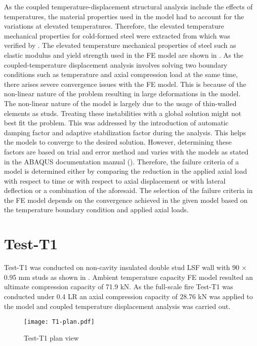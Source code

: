 As the coupled temperature-displacement structural analysis include the effects of temperatures, the material properties used in the model had to account for the variations at elevated temperatures. Therefore, the elevated temperature mechanical properties for cold-formed steel were extracted from \citet{Kankanamge2011} which was verified by \citet{Rokilan2019}. The elevated temperature mechanical properties of steel such as elastic modulus and yield strength used in the FE model are shown in . As the coupled-temperature displacement analysis involves solving two boundary conditions such as temperature and axial compression load at the same time, there arises severe convergence issues with the FE model. This is because of the non-linear nature of the problem resulting in large deformations in the model. The non-linear nature of the model is largely due to the usage of thin-walled elements as studs. Treating these instabilities with a global solution might not best fit the problem. This was addressed by the introduction of automatic damping factor and adaptive stabilization factor during the analysis. This helps the models to converge to the desired solution. However, determining these factors are based on trial and error method and varies with the models as stated in the ABAQUS documentation manual (\cite{abaqus2017}). Therefore, the failure criteria of a model is determined either by comparing the reduction in the applied axial load with respect to time or with respect to axial displacement or with lateral deflection or a combination of the aforesaid. The selection of the failure criteria in the FE model depends on the convergence achieved in the given model based on the temperature boundary condition and applied axial loads. 

\section*{Test-T1}

Test-T1 was conducted on non-cavity insulated double stud LSF wall with 90 $\times$ 0.95 mm studs as shown in . Ambient temperature capacity FE model resulted an ultimate compression capacity of 71.9 kN. As the full-scale fire Test-T1 was conducted under 0.4 LR an axial compression capacity of 28.76 kN was applied to the model and coupled temperature displacement analysis was carried out. 
\begin{figure}[!htbp]
	\centering
			\texttt{[image: T1-plan.pdf]}\\
		\caption{Test-T1 plan view}
		\label{fig:T1-plan-FEA}
\end{figure}

